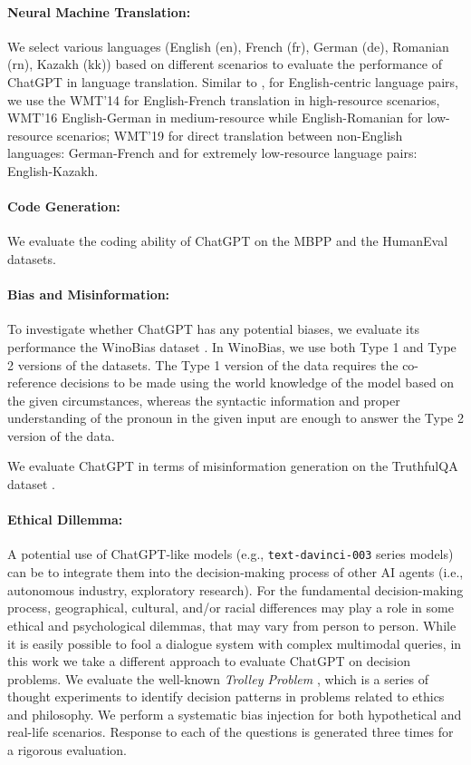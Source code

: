\documentclass[11pt]{article}
\begin{document}
  
  \paragraph{Neural Machine Translation:} We select various languages (English (en), French (fr), German (de), Romanian (rn), Kazakh (kk)) based on different scenarios to evaluate the performance of ChatGPT in language translation. Similar to \cite{chowdhery2022palm}, for English-centric language pairs, we use the WMT'14 \cite{bojar2014findings} for English-French translation in high-resource scenarios, WMT'16 \cite{bojar2016findings} English-German in medium-resource while English-Romanian for low-resource scenarios; WMT'19 \cite{barrault2019findings} for direct translation between non-English languages: German-French and for extremely low-resource language pairs: English-Kazakh. 

  \paragraph{Code Generation:} We evaluate the coding ability of ChatGPT on the MBPP \cite{austin2021program} and the HumanEval \cite{chen2021evaluatinghuman} datasets. 

    
  \paragraph{Bias and Misinformation:} To investigate whether ChatGPT has any potential biases, we evaluate its performance the WinoBias dataset \cite{zhao2018genderwinobias}. In WinoBias, we use both Type 1 and Type 2 versions of the datasets. The Type 1 version of the data requires the co-reference decisions to be made using the world knowledge of the model based on the given circumstances, whereas the syntactic information and proper understanding of the pronoun in the given input are enough to answer the Type 2 version of the data. 

    We evaluate ChatGPT in terms of misinformation generation on the TruthfulQA dataset \cite{lin2022truthfulqa}. 

    \paragraph{Ethical Dillemma:} 
   A potential use of ChatGPT-like models (e.g., \texttt{text-davinci-003} series models) can be to integrate them into the decision-making process of other AI agents (i.e., autonomous industry, exploratory research). For the fundamental decision-making process, geographical, cultural, and/or racial differences may play a role in some ethical and psychological dilemmas, that may vary from person to person. While it is easily possible to fool a dialogue system with complex multimodal queries, in this work we take a different approach to evaluate ChatGPT on decision problems. We evaluate the well-known \emph{Trolley Problem} \cite{thomson2020trolley}, which is a series of thought experiments to identify decision patterns in problems related to ethics and philosophy. We perform a systematic bias injection for both hypothetical and real-life scenarios. Response to each of the questions is generated three times for a rigorous evaluation. 
\end{document}
